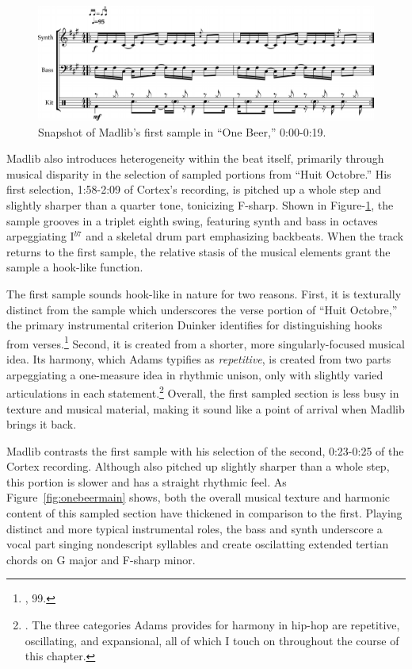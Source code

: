     \begin{figure}[ht]
        \centering
        \includegraphics[width=\textwidth]{images/figures/chp 02/000019onebeerintro.pdf}
        \caption{Snapshot of Madlib's first sample in ``One Beer,'' 0:00-0:19.}
        \label{fig:onebeerintro}
    \end{figure}

Madlib also introduces heterogeneity within the beat itself, primarily through musical disparity in the selection of sampled portions from ``Huit Octobre.'' His first selection, 1:58-2:09 of Cortex's recording, is pitched up a whole step and slightly sharper than a quarter tone,
tonicizing F-sharp. Shown in Figure-\ref{fig:onebeerintro}, the sample grooves in a triplet eighth swing, featuring synth and bass in octaves arpeggiating I$^{b7}$ and a skeletal drum part emphasizing backbeats. When the track returns to the first sample, the relative stasis of the musical elements grant the sample a hook-like function.

The first sample sounds hook-like in nature for two reasons. First, it is texturally distinct from the sample which underscores the verse portion of ``Huit Octobre,'' the primary instrumental criterion Duinker identifies for distinguishing hooks from verses.\footnote{\cite{benduinkerSongFormMainstreaming2020}, 99.} Second, it is created from a shorter, more singularly-focused musical idea. Its harmony, which Adams typifies as \emph{repetitive}, is created from two parts arpeggiating a one-measure idea in rhythmic unison, only with slightly varied articulations in each statement.\footnote{\cite{kyleadamsHarmonicSyntacticMotivic2020}. The three categories Adams provides for harmony in hip-hop are repetitive, oscillating, and expansional, all of which I touch on throughout the course of this chapter.} Overall, the first sampled section is less busy in texture and musical material, making it sound like a point of arrival when Madlib brings it back.

Madlib contrasts the first sample with his selection of the second, 0:23-0:25 of the Cortex recording. Although also pitched up slightly sharper than a whole step, this portion is slower and has a straight rhythmic feel. As Figure~\ref{fig:onebeermain} shows, both the overall musical texture and harmonic content of this sampled section have thickened in comparison to the first. Playing distinct and more typical instrumental roles, the bass and synth underscore a vocal part singing nondescript syllables and create oscilatting extended tertian chords on G major and F-sharp minor.

